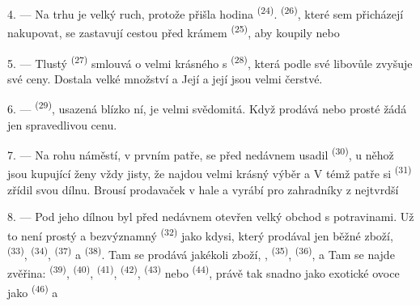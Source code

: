 \VUsaut{4.0mm}
\VUsaut{3.0mm}

4. --- Na trhu je velký ruch, protože přišla hodina  \textsuperscript{(24)}.
 \textsuperscript{(26)}, které sem přicházejí nakupovat, se zastavují cestou
před krámem  \textsuperscript{(25)}, aby koupily 
nebo 

5. --- Tlustý  \textsuperscript{(27)} smlouvá o velmi krásného
 s  \textsuperscript{(28)}, která podle své
libovůle zvyšuje své ceny. Dostala velké množství  a
 Její  a její  jsou velmi čerstvé.

\VUsaut{4.0mm}
\VUsaut{3.0mm}

6. ---  \textsuperscript{(29)}, usazená blízko ní, je velmi
svědomitá. Když prodává  nebo prosté  žádá jen
spravedlivou cenu.

7. --- Na rohu náměstí, v prvním patře, se před nedávnem usadil 
\textsuperscript{(30)}, u něhož jsou kupující ženy vždy jisty, že najdou velmi krásný výběr
  a  V témž patře si 
\textsuperscript{(31)} zřídil svou dílnu. Brousí  prodavaček v hale a vyrábí pro
zahradníky  z nejtvrdší

\VUsaut{4.0mm}
\VUsaut{3.0mm}

8. --- Pod jeho dílnou byl před nedávnem otevřen velký obchod s potravinami. Už to není prostý
a bezvýznamný  \textsuperscript{(32)} jako kdysi, který prodával jen běžné
zboží,  \textsuperscript{(33)},  \textsuperscript{(34)},
 \textsuperscript{(37)} a  \textsuperscript{(38)}. Tam se
prodává jakékoli zboží, ,
 \textsuperscript{(35)},  \textsuperscript{(36)},
  a  Tam se najde zvěřina:
 \textsuperscript{(39)},  \textsuperscript{(40)},
 \textsuperscript{(41)},  \textsuperscript{(42)},
 \textsuperscript{(43)} nebo 
\textsuperscript{(44)}, právě tak snadno jako exotické ovoce jako 
\textsuperscript{(46)} a 

